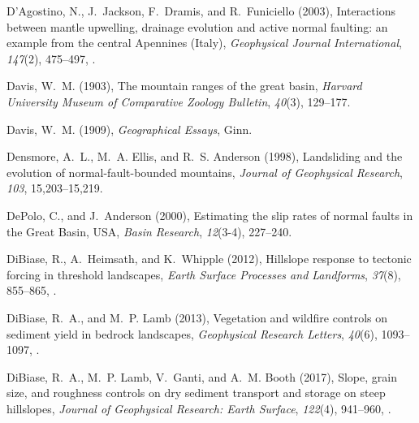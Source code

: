 \begin{thebibliography}{50}
D'Agostino, N., J.~Jackson, F.~Dramis, and R.~Funiciello (2003), {Interactions
  between mantle upwelling, drainage evolution and active normal faulting: an
  example from the central Apennines (Italy)}, \textit{Geophysical Journal
  International}, \textit{147}(2), 475--497,
  .

Davis, W.~M. (1903), The mountain ranges of the great basin, \textit{Harvard
  University Museum of Comparative Zoology Bulletin}, \textit{40}(3), 129--177.

Davis, W.~M. (1909), \textit{Geographical Essays}, Ginn.

Densmore, A.~L., M.~A. Ellis, and R.~S. Anderson (1998), Landsliding and the
  evolution of normal-fault-bounded mountains, \textit{Journal of Geophysical
  Research}, \textit{103}, 15,203--15,219.

DePolo, C., and J.~Anderson (2000), {Estimating the slip rates of normal faults
  in the Great Basin, USA}, \textit{Basin Research}, \textit{12}(3-4),
  227--240.

DiBiase, R., A.~Heimsath, and K.~Whipple (2012), Hillslope response to tectonic
  forcing in threshold landscapes, \textit{Earth Surface Processes and
  Landforms}, \textit{37}(8), 855--865, .

DiBiase, R.~A., and M.~P. Lamb (2013), Vegetation and wildfire controls on
  sediment yield in bedrock landscapes, \textit{Geophysical Research Letters},
  \textit{40}(6), 1093--1097, .

DiBiase, R.~A., M.~P. Lamb, V.~Ganti, and A.~M. Booth (2017), Slope, grain
  size, and roughness controls on dry sediment transport and storage on steep
  hillslopes, \textit{Journal of Geophysical Research: Earth Surface},
  \textit{122}(4), 941--960, .


\end{thebibliography}
